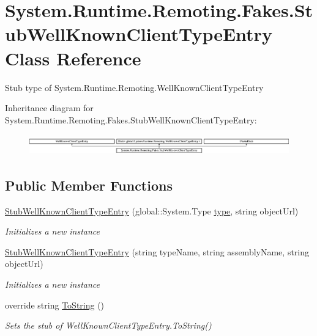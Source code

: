 \hypertarget{class_system_1_1_runtime_1_1_remoting_1_1_fakes_1_1_stub_well_known_client_type_entry}{\section{System.\-Runtime.\-Remoting.\-Fakes.\-Stub\-Well\-Known\-Client\-Type\-Entry Class Reference}
\label{class_system_1_1_runtime_1_1_remoting_1_1_fakes_1_1_stub_well_known_client_type_entry}
}


Stub type of System.\-Runtime.\-Remoting.\-Well\-Known\-Client\-Type\-Entry 


Inheritance diagram for System.\-Runtime.\-Remoting.\-Fakes.\-Stub\-Well\-Known\-Client\-Type\-Entry\-:\begin{figure}[H]
\begin{center}
\leavevmode
\includegraphics[height=0.912795cm]{class_system_1_1_runtime_1_1_remoting_1_1_fakes_1_1_stub_well_known_client_type_entry}
\end{center}
\end{figure}
\subsection*{Public Member Functions}
\begin{DoxyCompactItemize}
\item 
\hyperlink{class_system_1_1_runtime_1_1_remoting_1_1_fakes_1_1_stub_well_known_client_type_entry_ac4e64c8304c2e4f7227dcd4ec8a3d55e}{Stub\-Well\-Known\-Client\-Type\-Entry} (global\-::\-System.\-Type \hyperlink{jquery-1_810_82-vsdoc_8js_a3940565e83a9bfd10d95ffd27536da91}{type}, string object\-Url)
\begin{DoxyCompactList}\small\item\em Initializes a new instance\end{DoxyCompactList}\item 
\hyperlink{class_system_1_1_runtime_1_1_remoting_1_1_fakes_1_1_stub_well_known_client_type_entry_ac078d1474ffcbc924f247fc8e8be56f5}{Stub\-Well\-Known\-Client\-Type\-Entry} (string type\-Name, string assembly\-Name, string object\-Url)
\begin{DoxyCompactList}\small\item\em Initializes a new instance\end{DoxyCompactList}\item 
override string \hyperlink{class_system_1_1_runtime_1_1_remoting_1_1_fakes_1_1_stub_well_known_client_type_entry_a5cef6db2a8353e4c5ddecf23033faffc}{To\-String} ()
\begin{DoxyCompactList}\small\item\em Sets the stub of Well\-Known\-Client\-Type\-Entry.\-To\-String()\end{DoxyCompactList}\end{DoxyCompactItemize}
